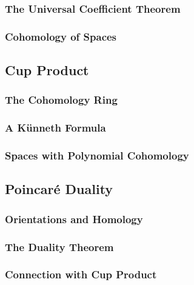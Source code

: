 \documentclass[11pt, a4paper]{article}
\begin{document}
\subsubsection{The Universal Coefficient Theorem}

\subsubsection{Cohomology of Spaces}

\subsection{Cup Product}

\subsubsection{The Cohomology Ring}

\subsubsection{A K\"unneth Formula}

\subsubsection{Spaces with Polynomial Cohomology}

\subsection{Poincar\'e Duality}

\subsubsection{Orientations and Homology}

\subsubsection{The Duality Theorem}

\subsubsection{Connection with Cup Product}
\end{document}
